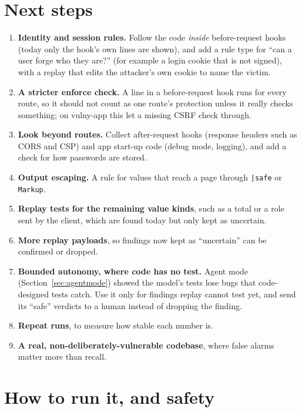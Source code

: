 \documentclass[11pt,a4paper]{article}
\newcommand{\code}[1]{\texttt{#1}}
\begin{document}
\section{Next steps}

\begin{enumerate}
  \item \textbf{Identity and session rules.} Follow the code \emph{inside} before-request hooks (today only the
        hook's own lines are shown), and add a rule type for ``can a user forge who they are?'' (for example a
        login cookie that is not signed), with a replay that edits the attacker's own cookie to name the victim.
  \item \textbf{A stricter enforce check.} A line in a before-request hook runs for every route, so it should not
        count as one route's protection unless it really checks something; on vulny-app this let a missing CSRF check
        through.
  \item \textbf{Look beyond routes.} Collect after-request hooks (response headers such as CORS and CSP) and
        app start-up code (debug mode, logging), and add a check for how passwords are stored.
  \item \textbf{Output escaping.} A rule for values that reach a page through \code{|safe} or \code{Markup}.
  \item \textbf{Replay tests for the remaining value kinds}, such as a total or a role sent by the client, which are
        found today but only kept as uncertain.
  \item \textbf{More replay payloads}, so findings now kept as ``uncertain'' can be confirmed or dropped.
  \item \textbf{Bounded autonomy, where code has no test.} Agent mode (Section~\ref{sec:agentmode}) showed the
        model's tests lose bugs that code-designed tests catch. Use it only for findings replay cannot test yet,
        and send its ``safe'' verdicts to a human instead of dropping the finding.
  \item \textbf{Repeat runs}, to measure how stable each number is.
  \item \textbf{A real, non-deliberately-vulnerable codebase}, where false alarms matter more than recall.
\end{enumerate}

\section{How to run it, and safety}
\end{document}
